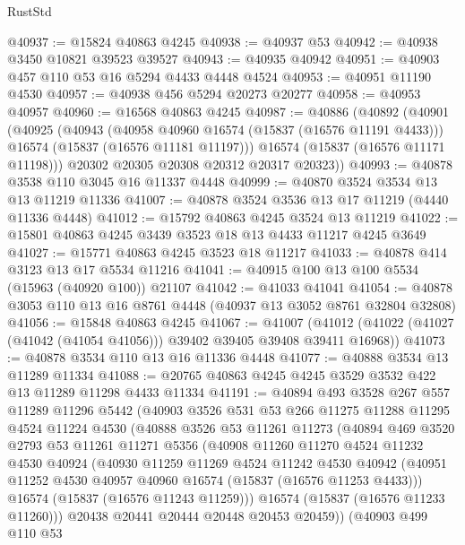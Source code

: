 \begin{lexlean}{RustStd}
\begin{coremodule}
@40937 := @15824 @40863 @4245
@40938 := @40937 @53
@40942 := @40938 @3450 @10821 @39523 @39527
@40943 := @40935 @40942
@40951 := @40903 @457 @110 @53 @16 @5294 @4433 @4448 @4524
@40953 := @40951 @11190 @4530
@40957 := @40938 @456 @5294 @20273 @20277
@40958 := @40953 @40957
@40960 := @16568 @40863 @4245
@40987 := @40886
    (@40892
      (@40901
        (@40925
          (@40943
            (@40958 @40960 @16574 (@15837 (@16576 @11191 @4433)))
            @16574
            (@15837 (@16576 @11181 @11197)))
          @16574
          (@15837 (@16576 @11171 @11198)))
        @20302
        @20305
        @20308
        @20312
        @20317
        @20323))
@40993 := @40878 @3538 @110 @3045 @16 @11337 @4448
@40999 := @40870 @3524 @3534 @13 @13 @11219 @11336
@41007 := @40878 @3524 @3536 @13 @17 @11219 (@4440 @11336 @4448)
@41012 := @15792 @40863 @4245 @3524 @13 @11219
@41022 := @15801 @40863 @4245 @3439 @3523 @18 @13 @4433 @11217 @4245 @3649
@41027 := @15771 @40863 @4245 @3523 @18 @11217
@41033 := @40878 @414 @3123 @13 @17 @5534 @11216
@41041 := @40915 @100 @13 @100 @5534 (@15963 (@40920 @100)) @21107
@41042 := @41033 @41041
@41054 := @40878 @3053 @110 @13 @16 @8761 @4448 (@40937 @13 @3052 @8761 @32804 @32808)
@41056 := @15848 @40863 @4245
@41067 := @41007
    (@41012 (@41022 (@41027 (@41042 (@41054 @41056))) @39402 @39405 @39408 @39411 @16968))
@41073 := @40878 @3534 @110 @13 @16 @11336 @4448
@41077 := @40888 @3534 @13 @11289 @11334
@41088 := @20765 @40863 @4245 @4245 @3529 @3532 @422 @13 @11289 @11298 @4433 @11334
@41191 := @40894
    @493
    @3528
    @267
    @557
    @11289
    @11296
    @5442
    (@40903
      @3526
      @531
      @53
      @266
      @11275
      @11288
      @11295
      @4524
      @11224
      @4530
      (@40888
        @3526
        @53
        @11261
        @11273
        (@40894
          @469
          @3520
          @2793
          @53
          @11261
          @11271
          @5356
          (@40908
            @11260
            @11270
            @4524
            @11232
            @4530
            @40924
            (@40930
              @11259
              @11269
              @4524
              @11242
              @4530
              @40942
              (@40951 @11252 @4530 @40957 @40960 @16574 (@15837 (@16576 @11253 @4433)))
              @16574
              (@15837 (@16576 @11243 @11259)))
            @16574
            (@15837 (@16576 @11233 @11260)))
          @20438
          @20441
          @20444
          @20448
          @20453
          @20459))
      (@40903
        @499
        @110
        @53

\end{coremodule}
\end{lexlean}
